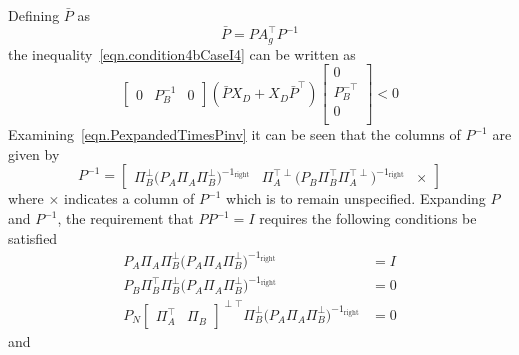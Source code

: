 \documentclass[journal]{IEEEtran}
\theoremstyle{innercustomthm}
\begin{document}
  Defining $\bar{P}$ as
  \begin{equation}
    \label{eqn.Pbar}
    \bar{P} = PA_{g}^{\top}P^{-1}
  \end{equation}
  the inequality\ \eqref{eqn.condition4bCaseI4} can be written as
  \begin{equation}
    \label{eqn.condition4bCaseI5}
    \begin{bmatrix}
      0 & P_{B}^{-1} & 0
    \end{bmatrix}
    (\bar{P}X_{D} + X_{D}\bar{P}^{\top})
    \begin{bmatrix}
      0 \\
      P_{B}^{-\top} \\
      0 \\
    \end{bmatrix}
    < 0
  \end{equation}
  Examining\ \eqref{eqn.PexpandedTimesPinv} it can be seen that the columns of $P^{-1}$ are given by
  {%
    \small
    \begin{equation}
      \label{eqn.PPinv}
      P^{-1} =
      \begin{bmatrix}
        \Pi_{B}^{\perp}\bigr(P_{A}\Pi_{A}\Pi_{B}^{\perp}\bigr)^{-1_{\text{right}}}
        &
        \Pi_{A}^{\top\perp}\bigr(P_{B}\Pi_{B}^{\top}\Pi_{A}^{\top\perp}\bigr)^{-1_{\text{right}}}
        &
        \times
      \end{bmatrix}
    \end{equation}
  }%
  where $\times$ indicates a column of $P^{-1}$ which is to remain unspecified.
  Expanding $P$ and $P^{-1}$, the requirement that $PP^{-1}=I$ requires the following conditions be satisfied
  \begin{equation}
    \label{eqn.firstColumnOfPinv}
    \begin{split}
      P_{A}\Pi_{A}\Pi_{B}^{\perp}\bigr(P_{A}\Pi_{A}\Pi_{B}^{\perp}\bigr)^{-1_{\text{right}}} &= I \\
      P_{B}\Pi_{B}^{\top}\Pi_{B}^{\perp}\bigr(P_{A}\Pi_{A}\Pi_{B}^{\perp}\bigr)^{-1_{\text{right}}} &= 0 \\
      P_{N}
      \begin{bmatrix}
        \Pi_{A}^{\top} & \Pi_{B}
      \end{bmatrix}^{\perp\top}
      \Pi_{B}^{\perp}\bigr(P_{A}\Pi_{A}\Pi_{B}^{\perp}\bigr)^{-1_{\text{right}}} &= 0
    \end{split}
  \end{equation}
  and
\end{document}
